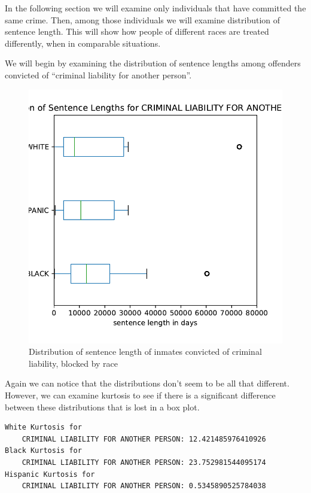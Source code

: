 \documentclass[11pt]{article}
\begin{document}
In the following section we will examine only individuals that have
committed the same crime. Then, among those individuals we will examine
distribution of sentence length. This will show how people of different
races are treated differently, when in comparable situations.

We will begin by examining the distribution of sentence lengths among
offenders convicted of ``criminal liability for another person''.

\begin{figure}[H]
    \centering
    \includegraphics[scale=.6]{images/crim_lib_box.pdf}
    \caption{Distribution of sentence length of inmates convicted of criminal liability, blocked by race}
    \label{fig:my_label}
\end{figure}
    
    Again we can notice that the distributions don't seem to be all that
different. However, we can examine kurtosis to see if there is a
significant difference between these distributions that is lost in a box
plot.

    \begin{Verbatim}[commandchars=\\\{\}]
White Kurtosis for
	CRIMINAL LIABILITY FOR ANOTHER PERSON: 12.421485976410926
Black Kurtosis for
	CRIMINAL LIABILITY FOR ANOTHER PERSON: 23.752981544095174
Hispanic Kurtosis for
	CRIMINAL LIABILITY FOR ANOTHER PERSON: 0.5345890525784038

    \end{Verbatim}
\end{document}

